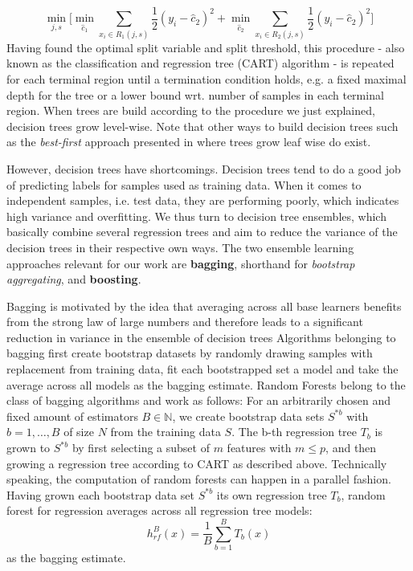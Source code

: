 \begin{equation}\label{minjs}
	\min_{j,s} \bigg [\min_{\hat{c}_1} \sum_{x_i \in R_1(j,s)} \dfrac{1}{2}(y_i - \hat{c}_{2})^2 + \min_{\hat{c}_2} \sum_{x_i \in R_{2}(j,s)} \dfrac{1}{2}(y_i - \hat{c}_{2})^2\bigg]
\end{equation}
Having found the optimal split variable and split threshold, this procedure - also known as the classification and regression tree (CART) algorithm - is repeated for each terminal region until a termination condition holds, e.g. a fixed maximal depth for the tree or a lower bound wrt. number of samples in each terminal region. When trees are build according to the procedure we just explained, decision trees grow level-wise. Note that other ways to build decision trees such as the \textit{best-first} approach presented in \cite{BestFirst} where trees grow leaf wise do exist. 

However, decision trees have shortcomings. Decision trees tend to do a good job of predicting labels for samples used as training data. When it comes to independent samples, i.e. test data, they are performing poorly, which indicates high variance and overfitting. We thus turn to  decision tree ensembles, which basically combine several regression trees and aim to reduce the variance of the decision trees in their respective own ways. 
The two ensemble learning approaches relevant for our work are \textbf{bagging}, shorthand for \textit{bootstrap aggregating}, and \textbf{boosting}. 

Bagging is motivated by the idea that averaging across all base learners benefits from the strong law of large numbers and therefore leads to a significant reduction in variance in the ensemble of decision trees 
Algorithms belonging to bagging first create bootstrap datasets by randomly drawing samples with replacement from training data, fit each bootstrapped set a model and take the average across all models as the bagging estimate.
Random Forests belong to the class of bagging algorithms and work as follows:
For an arbitrarily chosen and fixed amount of estimators $ B \in \mathbb{N}$, we create bootstrap data sets $ S^{*b} $ with $ b = 1, \dots, B $ of size $ N $ from the training data $ S $. The b-th regression tree $ T_b $ is grown to $ S^{*b} $ by first selecting a subset of $ m $ features with $ m \leq p $, and then growing a regression tree according to CART as described above. Technically speaking, the computation of random forests can happen in a parallel fashion.
Having grown each bootstrap data set $ S^{*b} $ its own regression tree $ T_b $, random forest for regression averages across all regression tree models:
\begin{equation}
h^{B}_{rf}(x) = \dfrac{1}{B} \sum_{b=1}^{B} T_b(x)
\end{equation}
as the bagging estimate.

